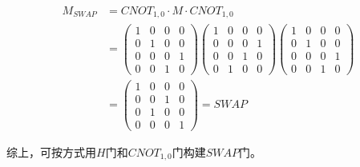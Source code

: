 \documentclass[12pt]{article}
\begin{document}
\begin{align*}
    M_{SWAP} &= CNOT_{1,0} \cdot M \cdot CNOT_{1,0} \\
    &=  \begin{pmatrix}1 & 0 & 0 & 0 \\ 0 & 1 & 0 & 0 \\ 0 & 0 & 0 & 1 \\ 0 & 0 & 1 & 0\end{pmatrix}
    \begin{pmatrix} 1 & 0 & 0 & 0 \\ 0 & 0 & 0 & 1 \\ 0 & 0 & 1 & 0 \\ 0 & 1 & 0 & 0\end{pmatrix}
    \begin{pmatrix}1 & 0 & 0 & 0 \\ 0 & 1 & 0 & 0 \\ 0 & 0 & 0 & 1 \\ 0 & 0 & 1 & 0\end{pmatrix} \\
    &= \begin{pmatrix} 1 & 0 & 0 & 0 \\ 0 & 0 & 1 & 0 \\ 0 & 1 & 0 & 0 \\ 0 & 0 & 0 & 1\end{pmatrix} = SWAP
\end{align*}

综上，可按方式用$H$门和$CNOT_{1,0}$门构建$SWAP$门。
\end{document}
